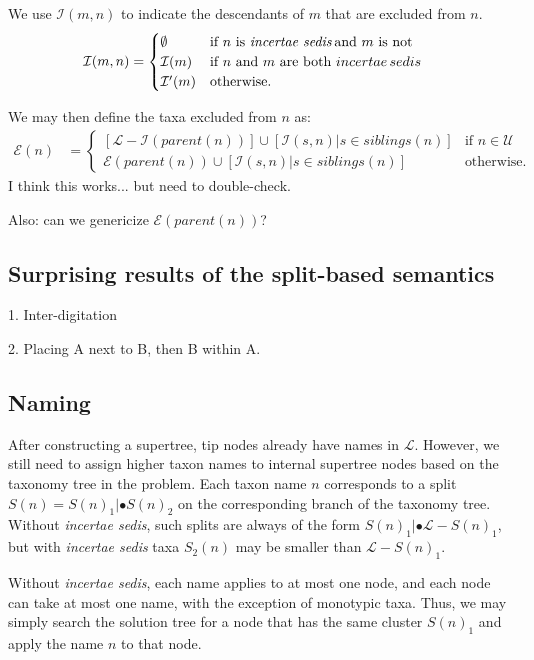 \documentclass[english]{article}
\begin{document}
We use $\mathcal{I}(m,n)$ to indicate the descendants of $m$ that are
excluded from $n$.
\begin{align*} \mathcal{I}(m,n) & =\begin{cases}
\emptyset & \text{if }n\text{ is \emph{incertae sedis}\,and }m\text{
is not}\\ \mathcal{I}(m) & \text{if }n\text{ and }m\text{ are both
}incertae\,sedis\\ \mathcal{I}^{\prime}(m) & \text{otherwise.}
\end{cases} \end{align*}

We may then define the taxa excluded from $n$ as:
\begin{align*}
\mathcal{E}(n) & =\begin{cases}
\left[\mathcal{L}-\mathcal{I}(parent(n))\right]\cup[\mathcal{I}(s,n)|s\in siblings(n)] & \text{if }n\in\mathcal{U}\\
\mathcal{E}(parent(n))\cup[\mathcal{I}(s,n)|s\in siblings(n)] & \text{otherwise.}
\end{cases}
\end{align*}
I think this works... but need to double-check.

Also: can we genericize $\mathcal{E}(parent(n))$?

\subsection{Surprising results of the split-based semantics}

1. Inter-digitation

2. Placing A next to B, then B within A.

\subsection{Naming }

After constructing a supertree, tip nodes already have names in \emph{$\mathcal{L}$}.
However, we still need to assign higher taxon names to internal supertree nodes
based on the taxonomy tree in the problem. Each taxon name $n$ corresponds to a
split $S(n)=S(n)_{1}|\bullet S(n)_{2}$ on the corresponding branch of the taxonomy tree. Without
\emph{incertae sedis}, such splits are always of the form $S(n)_{1}|\bullet\mathcal{L}-S(n)_{1}$, but
with \emph{incertae sedis} taxa $S_{2}(n)$ may be smaller than $\mathcal{L}-S(n)_{1}$.

Without \emph{incertae sedis}, each name applies to at most one node, and each
node can take at most one name, with the exception of monotypic taxa. Thus, we
may simply search the solution tree for a node that has the same cluster $S(n)_{1}$
and apply the name $n$ to that node.
\end{document}
